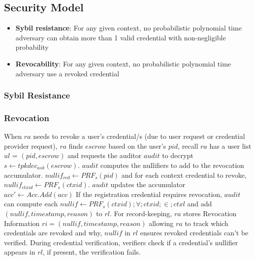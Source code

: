 \subsection{Security Model}
\begin{itemize}
    \item \textbf{Sybil resistance}: For any given context, no probabilistic polynomial time adversary can obtain more than 1 valid credential with non-negligible probability 
    
    \item \textbf{Revocability}: For any given context, no probabilistic polynomial time adversary use a revoked credential 
\end{itemize}

\subsubsection{Sybil Resistance}

\subsubsection{Revocation}
When $ra$ needs to revoke a user's credential/s (due to user request or credential provider request), $ra$ finds $escrow$ based on the user's $pid$, recall $ra$ has a user list $ul$ = $(pid, escrow)$ and requests the auditor $audit$ to decrypt $s \gets tpkdec_{ask}(escrow)$. $audit$ computes the nullifiers to add to the revocation accumulator. $nullif_{rcd} \gets PRF_s(pid)$ and for each context credential to revoke, $nullif_{ctxid} \gets PRF_s(ctxid)$. $audit$ updates the accumulator $acc' \gets Acc.Add(acc)$
If the registration credential requires revocation, $audit$ can compute each $nullif \gets PRF_{s}(ctxid) ; \forall ; ctxid ; \in ; ctxl$ and add $(nullif, timestamp, reason)$ to $rl$. For record-keeping, $ra$ stores Revocation Information $ri = (nullif, timestamp, reason)$ allowing $ra$ to track which credentials are revoked and why, $nullif$ in $rl$ ensures revoked credentials can't be verified.
During credential verification, verifiers check if a credential's nullifier appears in $rl$, if present, the verification fails.














\newpage
